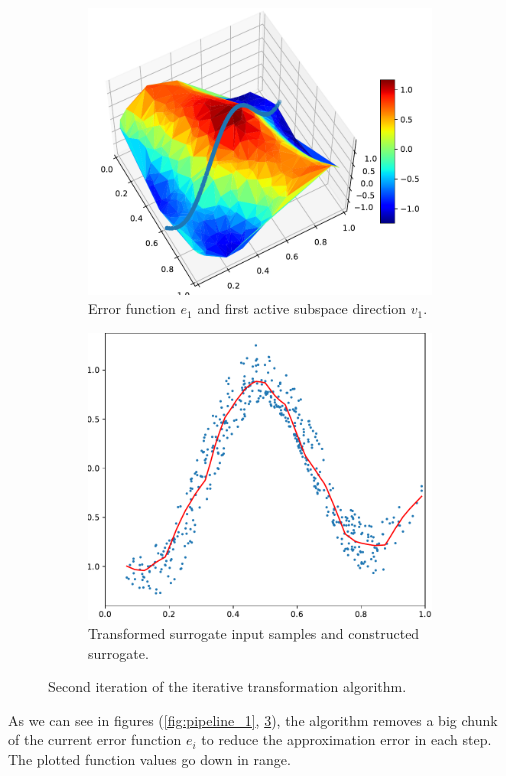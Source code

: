 \documentclass[
  a4paper,  %
  twoside,  %
  bibliography=totoc,
  headsepline,
  cleardoublepage=empty,
  parskip=half,
  draft=false
]{scrbook}
\begin{document}
\begin{figure}[H]
\begin{subfigure}{.45\textwidth}
  \centering
  \includegraphics[width=.8\linewidth]{graphics/pipeline_current_2}
  \caption{Error function $e_1$ and first active subspace direction $v_1$.}
  \label{fig:as_rn}
\end{subfigure}%
\hspace{0.07\textwidth}
\begin{subfigure}{.45\textwidth}
  \centering
  \includegraphics[width=.8\linewidth]{graphics/pipeline_local_2}
  \caption{Transformed surrogate input samples and constructed surrogate.}
  \label{fig:as_nn}
\end{subfigure}
\caption{Second iteration of the iterative transformation algorithm.}
\label{fig:pipeline_2}
\end{figure}

As we can see in figures (\ref{fig:pipeline_1}, \ref{fig:pipeline_2}), the algorithm removes a big chunk of the current error function $e_i$ to reduce the approximation error in each step.
The plotted function values go down in range.
\end{document}
